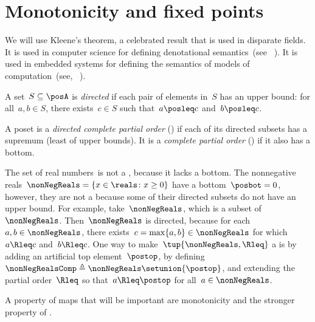 
\section{Monotonicity and fixed points}
\label{sec:Monotonicity-and-fixed}

We will use Kleene's theorem, a celebrated result that is used in disparate fields.
It is used in computer science for defining denotational semantics~(see \eg~\cite{manes86}).
It is used in embedded systems for defining the semantics of models of computation~(see, \eg~\cite{lee10}).

\begin{definition}
    \label{def:directed-set}
    A set~$S\subseteq\posA$ is \emph{directed} if each pair of elements in~$S$ has an upper bound: for all~$a,b\in S$, there exists~$c\in S$ such that~$a\posleq c$ and~$b\posleq c$.
\end{definition}

\begin{definition}[Completeness]
    \label{def:cpo}
    A poset is a \emph{directed complete partial order} (\DCPO) if each of its directed subsets has a supremum (least of upper bounds).
    It is a \emph{complete partial order} (\CPO) if it also has a bottom.
\end{definition}

\begin{example}
    \label{exa:Rcomp}
    The set of real numbers~\reals is not a \CPO, because it lacks a bottom.
    The nonnegative reals~$\nonNegReals=\{x\in\reals \colon x\geq0\}$ have a bottom~$\posbot=0$, however, they are not a \DCPO because some of their directed subsets do not have an upper bound.
    For example, take~$\nonNegReals$, which is a subset of~$\nonNegReals$.
    Then~$\nonNegReals$ is directed, because for each~$a,b\in\nonNegReals$, there exists~$c=\max\{a,b\}\in\nonNegReals$ for which~$a\Rleq c$ and~$b\Rleq c$.
    One way to make~$\tup{ \nonNegReals,\Rleq} $ a \CPO is by adding an artificial top element~$\postop$, by defining~$\nonNegRealsComp\triangleq\nonNegReals\setunion\{\postop\}$, and extending the partial order~$\Rleq$ so that~$a\Rleq\postop$ for all~$a\in\nonNegReals$.
\end{example}

A property of maps that will be important are monotonicity and the stronger property of \scottcontinuity.

